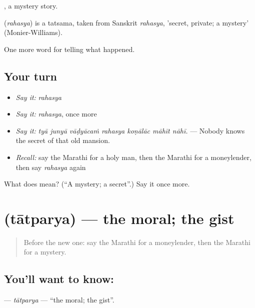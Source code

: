 , a mystery story.

\begin{cousinweb}
\textbf{} (\emph{rahasya}) is a tatsama, taken from Sanskrit \emph{rahasya}, 'secret, private; a mystery' (Monier-Williams).
\end{cousinweb}

\begin{grammarlens}[title={What you've built}]
One more word for telling what happened.
\end{grammarlens}

\subsection*{Your turn}
\begin{itemize}
\raggedright
  \item \emph{Say it:} \emph{rahasya}
  \item \emph{Say it:} \emph{rahasya}, once more
  \item \emph{Say it:} \emph{tyā junyā vāḍyācaṁ rahasya koṇālāc māhīt nāhī.} — Nobody knows the secret of that old mansion.
  \item \emph{Recall:} say the Marathi for a holy man, then the Marathi for a moneylender, then say \emph{rahasya} again
\end{itemize}

\begin{tcolorbox}[breakable,colback=teal!4,colframe=teal!35!black,title={Before you move on}]
What does  mean? (\textquotedblleft{}A mystery; a secret\textquotedblright{}.) Say it once more.
\end{tcolorbox}
\section[\texorpdfstring{\mr{तात्पर्य} (tātparya)}{तात्पर्य (tātparya)}]{ (tātparya) — the moral; the gist}

\label{lesson:MR-C340-tatparya}



\begin{quote}
Before the new one: say the Marathi for a moneylender, then the Marathi for a mystery.
\end{quote}

\subsection*{You'll want to know: }
\textbf{} — \emph{tātparya} — \textquotedblleft{}the moral; the gist\textquotedblright{}.


